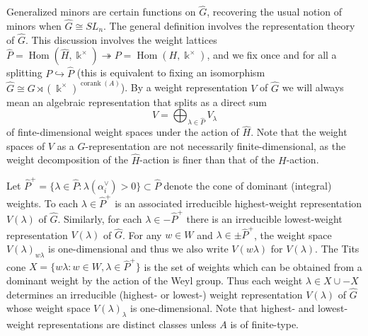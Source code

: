 \documentclass[12pt]{amsart}
\newcommand{\kk}{\Bbbk}%
\newcommand\onto{\twoheadrightarrow}
\newcommand\into{\hookrightarrow}
\DeclareMathOperator{\Hom}{Hom}
\DeclareMathOperator{\corank}{corank}
\theoremstyle{remark}
\numberwithin{equation}{section}
\begin{document}
Generalized minors are certain functions on $\widehat{G}$, recovering the usual notion of minors when $\widehat{G} \cong SL_n$. 
The general definition involves the representation theory of $\widehat{G}$. This discussion involves the weight lattices $\widehat{P} = \Hom(\widehat{H},\kk^\times) \onto P = \Hom(H,\kk^\times)$, and we fix once and for all a splitting $P \into \widehat{P}$ (this is equivalent to fixing an isomorphism $\widehat{G} \cong G \rtimes (\kk^\times)^{\corank(A)}$). 
By a weight representation $V$ of $\widehat{G}$ we will always mean an algebraic representation that splits as a direct sum
\[
V = \bigoplus_{\lambda \in \widehat{P}} V_\lambda
\]
of finte-dimensional weight spaces under the action of $\widehat{H}$. Note that the weight spaces of $V$ as a $G$-representation are not necessarily finite-dimensional, as the weight decomposition of the $\widehat{H}$-action is finer than that of the $H$-action. 



Let $\widehat{P}^+=\{\lambda \in \widehat{P}: \lambda(\alpha_i^\vee)>0\} \subset \widehat{P}$ denote the cone of dominant (integral) weights.  
To each $\lambda \in \widehat{P}^+$ is an associated irreducible highest-weight representation $V(\lambda)$ of $\widehat{G}$.
Similarly, for each $\lambda \in -\widehat{P}^+$ there is an irreducible lowest-weight representation $V(\lambda)$ of $\widehat{G}$.
For any $w\in W$ and $\lambda\in\pm\widehat{P}^+$, the weight space $V(\lambda)_{w\lambda}$ is one-dimensional and thus we also write $V(w\lambda)$ for $V(\lambda)$.  
The Tits cone $X = \{w\lambda : w \in W, \lambda \in \widehat{P}^+\}$ is the set of weights which can be obtained from a dominant weight by the action of the Weyl group. 
Thus each weight $\lambda\in X \cup -X$ determines an irreducible (highest- or lowest-) weight representation $V(\lambda)$ of $\widehat{G}$ whose weight space $V(\lambda)_\lambda$ is one-dimensional.
Note that highest- and lowest-weight representations are distinct classes unless $A$ is of finite-type.
\end{document}
